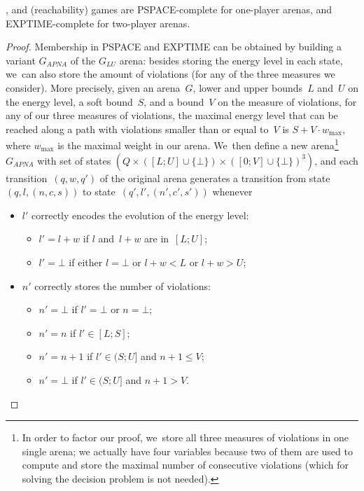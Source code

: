 \begin{theorem}
\label{thm_apna_LUHV_2P}
\LVenergynb, \LVenergyconsnb and \LVenergysum (reachability) games
are PSPACE-complete for one-player arenas, and EXPTIME-complete for
two-player arenas.
\end{theorem}
\begin{proof}
    Membership in PSPACE and EXPTIME can be obtained by building a
  variant $G_{APNA}$ of the $G_{LU}$ arena: besides storing the energy level in
  each state, we~can also store the amount of violations (for any of
  the three measures we consider). More precisely, given an arena~$G$,
  lower and upper bounds~$L$ and~$U$ on the energy level, a soft bound~$S$,
  and a
  bound~$V$ on the measure of violations, for any of our three
  measures of violations, the maximal energy level that can be reached
  along a path with violations smaller than or equal to~$V$ is
  $S+V\cdot w_{\max}$, where $w_{\max}$ is the maximal weight in our
  arena.  We~then define a new arena\footnote{In order to factor our
    proof, we~store all three measures of violations in one single
    arena; we actually have four variables because two of them are used
    to compute and store the maximal number of consecutive violations
    (which for solving the decision problem is not needed).}~$G_{APNA}$ with set of
  states 
  $(Q\times([L;U]\cup\{\bot\})\times ([0;V]\cup\{\bot\})^3)$,   
  and each transition~$(q,w,q')$ of the
  original arena generates a transition from state
  $(q,l,(n,c,s))$ to state~$(q',l',(n',c',s'))$ whenever
  \begin{itemize}
  \item $l'$ correctly encodes the evolution of the energy level:
    \begin{itemize}
    \item $l'=l+w$ if $l$ and~$l+w$ are in~$[L;U]$; 
    \item $l'=\bot$ if either $l=\bot$ or $l+w<L$ or $l+w>U$;
    \end{itemize}
  \item $n'$ correctly stores the number of violations:
    \begin{itemize}
    \item $n'=\bot$ if $l'=\bot$ or $n=\bot$;
    \item $n'=n$ if $l'\in [L;S]$;
    \item $n'=n+1$ if $l'\in(S;U]$ and $n+1\leq V$;
    \item $n'=\bot$ if $l'\in(S;U]$ and $n+1>V$.

\end{itemize}
\end{itemize}
\end{proof}
